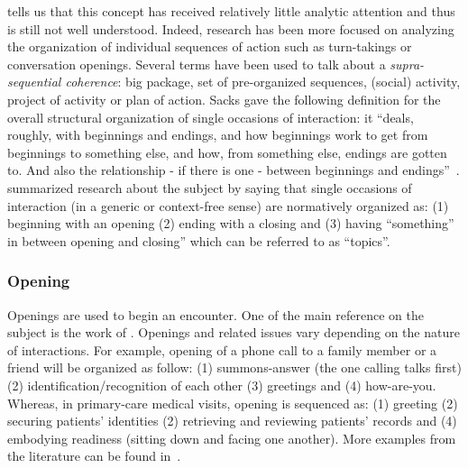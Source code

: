 \documentclass[a4paper,11pt,twoside]{StyleThese}
\begin{document}
\cite{robinson_overall_2012} tells us that this concept has received relatively little analytic attention and thus is still not well understood. Indeed, research has been more focused on analyzing the organization of individual sequences of action such as turn-takings or conversation openings. Several terms have been used to talk about a \emph{supra-sequential coherence}: big package, set of pre-organized sequences, (social) activity, project of activity or plan of action. Sacks gave the following definition for the overall structural organization of single occasions of interaction: it ``deals, roughly, with beginnings and endings, and how beginnings work to get from beginnings to something else, and how, from something else, endings are gotten to. And also the relationship - if there is one - between beginnings and endings''~\citep[p.~157]{sacks_lectures_1995}. \cite{robinson_overall_2012} summarized research about the subject by saying that single occasions of interaction (in a generic or context-free sense) are normatively organized as: (1) beginning with an opening (2) ending with a closing and (3) having ``something'' in between opening and closing'' which can be referred to as ``topics''.

\subsubsection{Opening}
Openings are used to begin an encounter. One of the main reference on the subject is the work of \cite{schegloff_1986_routine}. Openings and related issues vary depending on the nature of interactions. For example, opening of a phone call to a family member or a friend will be organized as follow: (1) summons-answer (the one calling talks first) (2) identification/recognition of each other (3) greetings and (4) how-are-you. Whereas, in primary-care medical visits, opening is sequenced as: (1) greeting (2) securing patients’ identities (2) retrieving and reviewing patients’ records and (4) embodying readiness (sitting down and facing one another). More examples from the literature can be found in~\citep{robinson_overall_2012}. 
\end{document}
